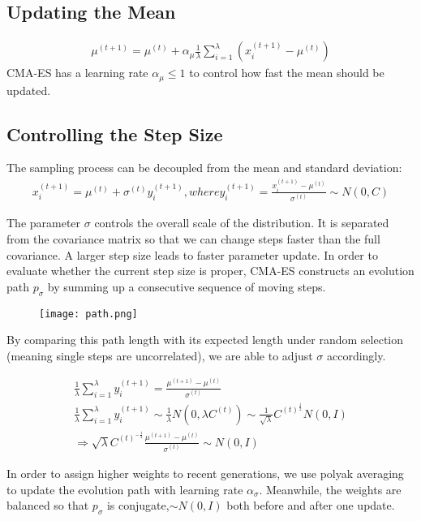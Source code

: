 \documentclass[12pt]{article}
\begin{document}
\subsection{Updating the Mean}
\begin{align}
	\mu^{(t+1)}=\mu^{(t)}+\alpha_\mu \frac{1}{\lambda}\sum_{i=1}^\lambda(x_i^{(t+1)}-\mu^{(t)})	
\end{align}
CMA-ES has a learning rate $\alpha_\mu\leq 1$ to control 
how fast the mean  should be updated. 

\subsection{Controlling the Step Size}
The sampling process can be decoupled from the mean and standard deviation:
\begin{align}
	x_i^{(t+1)}=\mu^{(t)}+\sigma^{(t)}y_i^{(t+1)}, where y_i^{(t+1)}=\frac{x_i^{(t+1)}-\mu^{(t)}}{\sigma^{(t)}}\sim N(0,C)
\end{align}

The parameter $\sigma$  controls the overall scale of the distribution. 
It is separated from the covariance matrix so that we can change steps 
faster than the full covariance. 
A larger step size leads to faster parameter update. 
In order to evaluate whether the current step size is proper, CMA-ES 
constructs an evolution path $p_\sigma$ 
by summing up a consecutive sequence of moving steps.
\begin{figure}[htbp]
	\centering
	\texttt{[image: path.png]}
\end{figure}

By comparing this path length with its expected length 
under random selection (meaning single steps are uncorrelated), 
we are able to adjust $\sigma$ accordingly.

\begin{gather}
	\frac{1}{\lambda}\sum_{i=1}^{\lambda}y_i^{(t+1)}=\frac{\mu^{(t+1)}-\mu^{(t)}}{\sigma^{(t)}}\\
	\frac{1}{\lambda}\sum_{i=1}^{\lambda}y_i^{(t+1)}\sim\frac{1}{\lambda}N(0,\lambda C^{(t)})\sim \frac{1}{\sqrt{\lambda}}C^{(t)^{\frac{1}{2}}}N(0,I)\\
	\Longrightarrow \sqrt{\lambda}C^{(t)^{-\frac{1}{2}}}\frac{\mu^{(t+1)}-\mu^{(t)}}{\sigma^{(t)}}\sim N(0,I)
\end{gather}

In order to assign higher weights to recent generations, 
we use polyak averaging to update the evolution path with learning rate $\alpha_\sigma$.
Meanwhile, the weights are balanced so that $p_\sigma$ is conjugate,$\sim N(0,I)$ 
both before and after one update.
\end{document}
